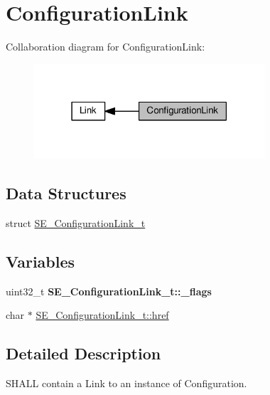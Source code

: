 \hypertarget{group__ConfigurationLink}{}\section{Configuration\+Link}
\label{group__ConfigurationLink}
Collaboration diagram for Configuration\+Link\+:\nopagebreak
\begin{figure}[H]
\begin{center}
\leavevmode
\includegraphics[width=243pt]{group__ConfigurationLink}
\end{center}
\end{figure}
\subsection*{Data Structures}
\begin{DoxyCompactItemize}
\item 
struct \hyperlink{structSE__ConfigurationLink__t}{S\+E\+\_\+\+Configuration\+Link\+\_\+t}
\end{DoxyCompactItemize}
\subsection*{Variables}
\begin{DoxyCompactItemize}
\item 
\mbox{\label{group__ConfigurationLink_ga0a796af9f07ef35244bfcc2a2c90dfcf}} 
uint32\+\_\+t {\bfseries S\+E\+\_\+\+Configuration\+Link\+\_\+t\+::\+\_\+flags}
\item 
char $\ast$ \hyperlink{group__ConfigurationLink_ga4902a2316344c9ca93cad0f7aa9ee620}{S\+E\+\_\+\+Configuration\+Link\+\_\+t\+::href}
\end{DoxyCompactItemize}


\subsection{Detailed Description}
S\+H\+A\+LL contain a Link to an instance of Configuration. 

